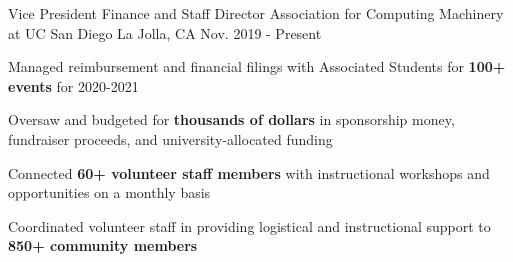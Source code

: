 
\begin{cventries}

  \cventry
    {Vice President Finance and Staff Director} %
    {Association for Computing Machinery at UC San Diego} %
    {La Jolla, CA} %
    {Nov. 2019 - Present} %
    {
      \begin{cvitems} %
        \item {Managed reimbursement and financial filings with Associated Students for \textbf{100+ events} for 2020-2021}
        \item {Oversaw and budgeted for \textbf{thousands of dollars} in sponsorship money, fundraiser proceeds, and university-allocated funding}
        \item {Connected \textbf{60+ volunteer staff members} with instructional workshops and opportunities on a monthly basis}
        \item {Coordinated volunteer staff in providing logistical and instructional support to \textbf{850+ community members}}
      \end{cvitems}
    }



\end{cventries}
